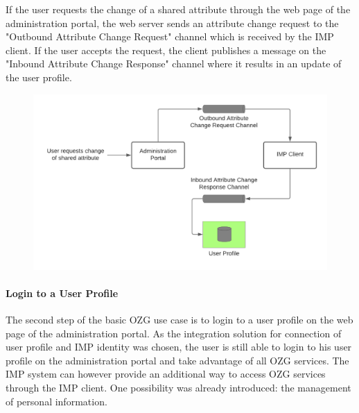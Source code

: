 \documentclass[
     12pt,         %
     a4paper,      %
     BCOR=10mm,version=first,     %
     DIV=14,version=first,        %
     ]{scrreprt}
\begin{document}
If the user requests the change of a shared attribute through the web page of the administration portal, the web server sends an attribute change request to the "Outbound Attribute Change Request" channel which is received by the IMP client. If the user accepts the request, the client publishes a message on the "Inbound Attribute Change Response" channel where it results in an update of the user profile.

\begin{figure}[h]
    \centering
    \includegraphics[scale=0.3]{Diagrams/Integration Architecture 1/Overview/Attribute Change Web Page.png}
\end{figure}

\paragraph{Login to a User Profile}

The second step of the basic OZG use case is to login to a user profile on the web page of the administration portal. As the integration solution for connection of user profile and IMP identity was chosen, the user is still able to login to his user profile on the administration portal and take advantage of all OZG services. The IMP system can however provide an additional way to access OZG services through the IMP client. One possibility was already introduced: the management of personal information.
\end{document}
